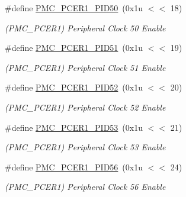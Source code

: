 \begin{DoxyCompactItemize}
\mbox{\label{group__SAME70__PMC_ga800982648678f1a581f2f930ea1eddf8}} 
\#define \mbox{\hyperlink{group__SAME70__PMC_ga800982648678f1a581f2f930ea1eddf8}{P\+M\+C\+\_\+\+P\+C\+E\+R1\+\_\+\+P\+I\+D50}}~(0x1u $<$$<$ 18)
\begin{DoxyCompactList}\small\item\em (P\+M\+C\+\_\+\+P\+C\+E\+R1) Peripheral Clock 50 Enable \end{DoxyCompactList}\item 
\mbox{\label{group__SAME70__PMC_gae2daae0c6d3921f358e5ff5322e7afc4}} 
\#define \mbox{\hyperlink{group__SAME70__PMC_gae2daae0c6d3921f358e5ff5322e7afc4}{P\+M\+C\+\_\+\+P\+C\+E\+R1\+\_\+\+P\+I\+D51}}~(0x1u $<$$<$ 19)
\begin{DoxyCompactList}\small\item\em (P\+M\+C\+\_\+\+P\+C\+E\+R1) Peripheral Clock 51 Enable \end{DoxyCompactList}\item 
\mbox{\label{group__SAME70__PMC_gaeb901f7df5ece868c18ca3639243d086}} 
\#define \mbox{\hyperlink{group__SAME70__PMC_gaeb901f7df5ece868c18ca3639243d086}{P\+M\+C\+\_\+\+P\+C\+E\+R1\+\_\+\+P\+I\+D52}}~(0x1u $<$$<$ 20)
\begin{DoxyCompactList}\small\item\em (P\+M\+C\+\_\+\+P\+C\+E\+R1) Peripheral Clock 52 Enable \end{DoxyCompactList}\item 
\mbox{\label{group__SAME70__PMC_ga8b8a346dd4009ecfef9c1575ecffd890}} 
\#define \mbox{\hyperlink{group__SAME70__PMC_ga8b8a346dd4009ecfef9c1575ecffd890}{P\+M\+C\+\_\+\+P\+C\+E\+R1\+\_\+\+P\+I\+D53}}~(0x1u $<$$<$ 21)
\begin{DoxyCompactList}\small\item\em (P\+M\+C\+\_\+\+P\+C\+E\+R1) Peripheral Clock 53 Enable \end{DoxyCompactList}\item 
\mbox{\label{group__SAME70__PMC_ga30b2500985269dae733e4d36b1e725cb}} 
\#define \mbox{\hyperlink{group__SAME70__PMC_ga30b2500985269dae733e4d36b1e725cb}{P\+M\+C\+\_\+\+P\+C\+E\+R1\+\_\+\+P\+I\+D56}}~(0x1u $<$$<$ 24)
\begin{DoxyCompactList}\small\item\em (P\+M\+C\+\_\+\+P\+C\+E\+R1) Peripheral Clock 56 Enable \end{DoxyCompactList}\item 
$$
\end{DoxyCompactItemize}
